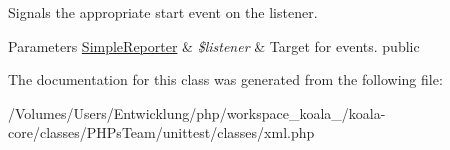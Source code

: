 \label{class_nesting_method_tag_a9d29783caa420bbd786c51e1b400a481}
Signals the appropriate start event on the listener. 
\begin{DoxyParams}[1]{Parameters}
\hyperlink{class_simple_reporter}{SimpleReporter} & {\em \$listener} & Target for events.  public \\
\hline
\end{DoxyParams}


The documentation for this class was generated from the following file:\begin{DoxyCompactItemize}
\item 
/Volumes/Users/Entwicklung/php/workspace\_\-koala\_/koala-\/core/classes/PHPsTeam/unittest/classes/xml.php\end{DoxyCompactItemize}
